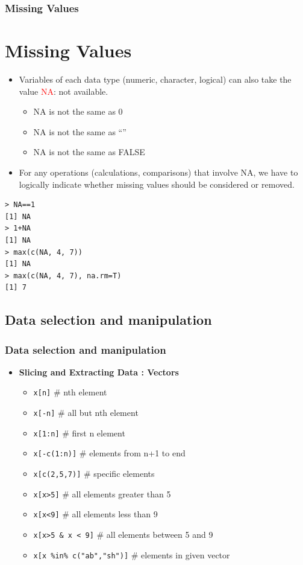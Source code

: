 \documentclass[12pt]{beamer}
\begin{document}
\begin{frame}[fragile]
\frametitle{Missing Values}
\section{Missing Values}
\begin{itemize}\justifying
	\item Variables of each data type (numeric, character, logical) can also take the
	value \textcolor{red}{NA}: not available.
	\begin{itemize}
		\item NA is not the same as 0
		\item NA is not the same as ``''
		\item NA is not the same as FALSE
	\end{itemize}
\item For any operations (calculations, comparisons) that involve NA, we have to
logically indicate whether missing values should be considered or removed.
\end{itemize}
\begin{verbatim}
> NA==1
[1] NA
> 1+NA
[1] NA
> max(c(NA, 4, 7))
[1] NA
> max(c(NA, 4, 7), na.rm=T)
[1] 7
\end{verbatim}
\end{frame}

\begin{frame}[fragile]
\section{Data selection and manipulation}
\frametitle{Data selection and manipulation }
\begin{itemize}\justifying
	\item \textbf{Slicing and Extracting Data : Vectors}
	\begin{itemize}\justifying
		\item \verb|x[n]| \hfill \# nth element
		\item  \verb|x[-n]| \hfill \# all but nth element
		\item  \verb|x[1:n]| \hfill \# first n element
		\item  \verb|x[-c(1:n)]| \hfill \# elements from n+1 to end
		\item  \verb|x[c(2,5,7)]| \hfill \# specific elements
		\item  \verb|x[x>5]| \hfill \# all elements greater than 5
		\item  \verb|x[x<9]| \hfill \# all elements less than 9
		\item  \verb|x[x>5 & x < 9]| \hfill \# all elements between 5 and 9
		\item  \verb|x[x %in% c("ab","sh")]| \hfill \# elements in given vector
	\end{itemize}
\end{itemize}
\end{frame}
\end{document}
